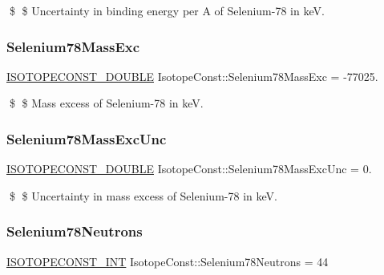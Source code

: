\$ \$ Uncertainty in binding energy per A of Selenium-\/78 in keV. \mbox{\label{group___isotope_const-_selenium-_se78_ga114aaf4b1f9131ce7632d25ad1a3449e}} 
\subsubsection{\texorpdfstring{Selenium78\+Mass\+Exc}{Selenium78MassExc}}
{\footnotesize\ttfamily \mbox{\hyperlink{group___isotope_const-_macros_ga8f45a7272ce02c0b4c65c44636ed719a}{I\+S\+O\+T\+O\+P\+E\+C\+O\+N\+S\+T\+\_\+\+D\+O\+U\+B\+LE}} Isotope\+Const\+::\+Selenium78\+Mass\+Exc = -\/77025.}

\$ \$ Mass excess of Selenium-\/78 in keV. \mbox{\label{group___isotope_const-_selenium-_se78_gabede438fcba615df6599b1e0838d2f48}} 
\subsubsection{\texorpdfstring{Selenium78\+Mass\+Exc\+Unc}{Selenium78MassExcUnc}}
{\footnotesize\ttfamily \mbox{\hyperlink{group___isotope_const-_macros_ga8f45a7272ce02c0b4c65c44636ed719a}{I\+S\+O\+T\+O\+P\+E\+C\+O\+N\+S\+T\+\_\+\+D\+O\+U\+B\+LE}} Isotope\+Const\+::\+Selenium78\+Mass\+Exc\+Unc = 0.}

\$ \$ Uncertainty in mass excess of Selenium-\/78 in keV. \mbox{\label{group___isotope_const-_selenium-_se78_ga021a56e76efc6f3122666b2c4f2b00e4}} 
\subsubsection{\texorpdfstring{Selenium78\+Neutrons}{Selenium78Neutrons}}
{\footnotesize\ttfamily \mbox{\hyperlink{group___isotope_const-_macros_ga5f18360b3e99483a35c32d789e62621c}{I\+S\+O\+T\+O\+P\+E\+C\+O\+N\+S\+T\+\_\+\+I\+NT}} Isotope\+Const\+::\+Selenium78\+Neutrons = 44}

